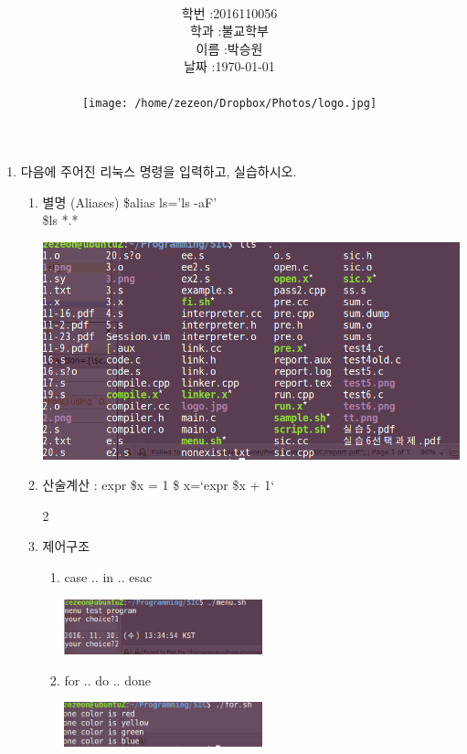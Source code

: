 \documentclass[12pt,a4paper]{article}
\title{
	\centering
	\pgfornament[width=12cm,color=teal]{84}\\
	\vspace{1cm}
	\fontsize{50}{50} \selectfont {시스템 S/W 실습10}\\
	\pgfornament[width=12cm,color=teal]{88}\\
	\vfill}
\author{
	\LARGE
	\begin{tabular}{rl}
		\hline
		학번 : & 2016110056\\ 
		학과 : & 불교학부 \\
		이름 : & 박승원\\
		날짜 : & \today\\
		\hline
	\end{tabular}\vspace{2cm}
	\\
	\texttt{[image: /home/zezeon/Dropbox/Photos/logo.jpg]}
}
\date{}
\begin{document}
\maketitle
\newpage
\noindent
\lstset{columns=flexible, tabsize=4, frame=single, showstringspaces=false, breaklines=true, upquote=true}

\lstset{language=C++}
\begin{enumerate}
\item 다음에 주어진 리눅스 명령을 입력하고, 실습하시오.
\begin{enumerate}
	

\item 별명 (Aliases)
\$alias ls='ls -aF'\\
\$ls *.*

\includegraphics[width=\textwidth]{1.png}

\item 산술계산 : expr
\$x = 1
\$ x=`expr \$x + 1`

2

\item 제어구조
\begin{enumerate}
	\item case .. in .. esac


\includegraphics[width=0.5\textwidth]{2.png}

\item for .. do .. done

\includegraphics[width=0.5\textwidth]{3.png}


\end{enumerate}
\end{enumerate}
\end{enumerate}
\end{document}
